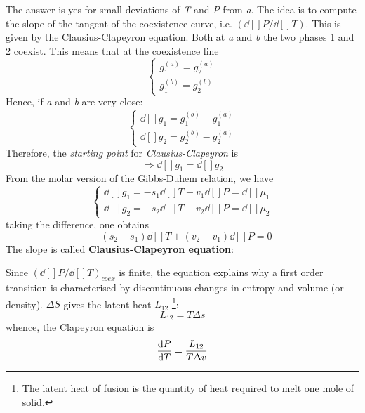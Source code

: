 \documentclass[../../Main/Main.tex]{subfiles}
\begin{document}
The answer is yes for small deviations of \emph{T} and \emph{P} from \emph{a}. The idea is to compute the slope of the tangent of the coexistence curve, i.e. \( (\dd[]{P}/\dd[]{T}  )  \). This is given by the Clausius-Clapeyron equation.
Both at \emph{a} and \emph{b} the two phases 1 and 2 coexist. This means  that at the coexistence line
\begin{equation}
  \begin{cases}
   g_1^{(a)} = g_2^{(a)}\\
   g_1^{(b)} = g_2^{(b)}
  \end{cases}
\label{eq:}
\end{equation}
Hence, if \emph{a} and \emph{b} are very close:
\begin{equation}
  \begin{cases}
  \dd[]{g_1} = g_1^{(b)} - g_1^{(a)} \\
  \dd[]{g_2} = g_2^{(b)} - g_2^{(a)}
  \end{cases}
\label{eq:}
\end{equation}
Therefore, the \emph{starting point} for \emph{Clausius-Clapeyron} is
\begin{equation}
  \Rightarrow \dd[]{g_1} =\dd[]{g_2}
  \label{eq:}
\end{equation}
From the molar version of the Gibbs-Duhem relation, we have
\begin{equation}
  \begin{cases}
   \dd[]{g_1} = -s_1 \dd[]{T} + v_1 \dd[]{P} = \dd[]{\mu _1}    \\
   \dd[]{g_2} = -s_2 \dd[]{T} + v_2 \dd[]{P} = \dd[]{\mu _2}
  \end{cases}
\label{eq:}
\end{equation}
taking the difference, one obtains
\begin{equation*}
  -(s_2 - s_1) \dd[]{T} + (v_2 - v_1) \dd[]{P} = 0
\end{equation*}
The slope is called \textbf{Clausius-Clapeyron equation}:
\begin{remark}
Since \( (\dd[]{P}/\dd[]{T})_{coex}   \) is finite, the equation explains why a first order transition is characterised by discontinuous changes in entropy and volume (or density). \( \Delta S \)  gives the latent heat \( L_{12} \) \footnote{The latent heat of fusion is the quantity of heat required to melt one mole of solid.}:
\begin{equation}
  L_{12} = T \Delta s
\end{equation}
whence, the Clapeyron equation is
\begin{equation}
  \dv{P}{T}  = \frac{L_{12}}{T \Delta v}
\end{equation}
\end{remark}
\end{document}
